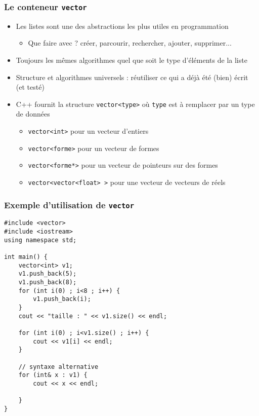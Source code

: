 \begin{frame}[fragile]\frametitle{Le conteneur \texttt{vector}}
\begin{itemize}
\item Les listes sont une des abstractions les plus utiles en programmation
\begin{itemize}
\item Que faire avec ? créer, parcourir, rechercher, ajouter, supprimer...
\end{itemize}
\item Toujours les mêmes algorithmes quel que soit le type d'éléments de la liste
\item Structure et algorithmes universels : réutiliser ce qui a déjà été (bien) écrit (et testé)
\item C++ fournit la structure \verb|vector<type>| où \verb|type| est à remplacer par un type de données
\begin{itemize}
\item  \verb|vector<int>| pour un vecteur d'entiers
\item \verb|vector<forme>| pour un vecteur de formes
\item \verb|vector<forme*>| pour un vecteur de pointeurs sur des formes
\item \verb|vector<vector<float> >| pour une vecteur de vecteurs de réels
\end{itemize}
\end{itemize}
\end{frame}

\begin{frame}[fragile]\frametitle{Exemple d'utilisation de \texttt{vector}}
\begin{lstlisting}
#include <vector>
#include <iostream>
using namespace std;

int main() {
    vector<int> v1;
    v1.push_back(5);
    v1.push_back(8);
    for (int i(0) ; i<8 ; i++) {
        v1.push_back(i);
    }
    cout << "taille : " << v1.size() << endl;

    for (int i(0) ; i<v1.size() ; i++) {
        cout << v1[i] << endl;
    }

    // syntaxe alternative
    for (int& x : v1) {
        cout << x << endl;

    }
}
\end{lstlisting}
\end{frame}


